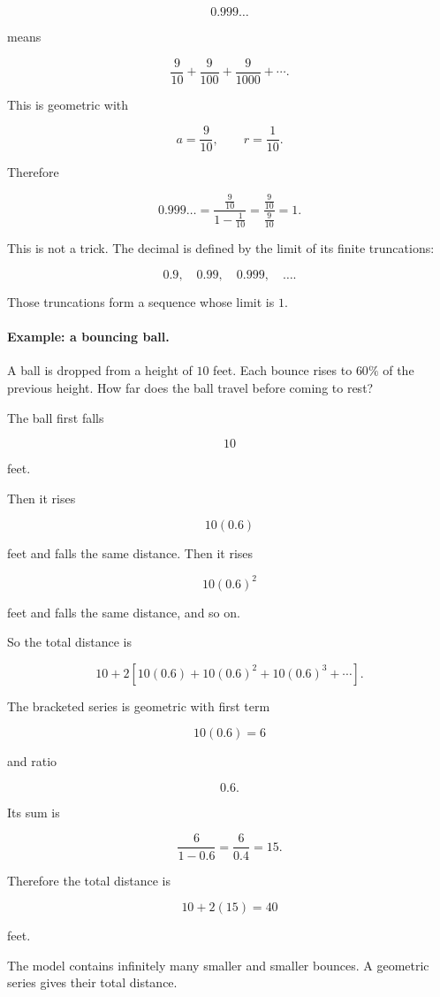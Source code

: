 \[
0.999\ldots
\]

means

\[
\frac9{10}+\frac9{100}+\frac9{1000}+\cdots.
\]

This is geometric with

\[
a=\frac9{10},
\qquad
r=\frac1{10}.
\]

Therefore

\[
0.999\ldots
=
\frac{\frac9{10}}{1-\frac1{10}}
=
\frac{\frac9{10}}{\frac9{10}}
=
\boxed{1}.
\]

This is not a trick.  The decimal is defined by the limit of its finite truncations:

\[
0.9,\quad 0.99,\quad 0.999,\quad\ldots.
\]

Those truncations form a sequence whose limit is \(1\).

\paragraph{Example: a bouncing ball.}
A ball is dropped from a height of \(10\) feet.  Each bounce rises to \(60\%\) of the
previous height.  How far does the ball travel before coming to rest?

The ball first falls

\[
10
\]

feet.

Then it rises

\[
10(0.6)
\]

feet and falls the same distance.  Then it rises

\[
10(0.6)^2
\]

feet and falls the same distance, and so on.

So the total distance is

\[
10+2\left[10(0.6)+10(0.6)^2+10(0.6)^3+\cdots\right].
\]

The bracketed series is geometric with first term

\[
10(0.6)=6
\]

and ratio

\[
0.6.
\]

Its sum is

\[
\frac{6}{1-0.6}=\frac6{0.4}=15.
\]

Therefore the total distance is

\[
10+2(15)=\boxed{40}
\]

feet.

The model contains infinitely many smaller and smaller bounces.  A geometric series
gives their total distance.

